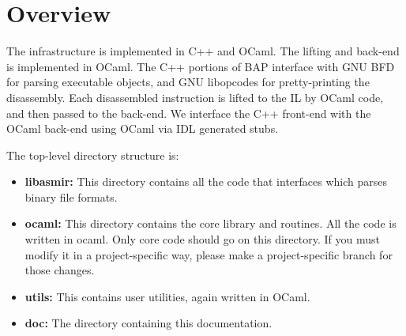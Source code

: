 \section{Overview}

The \bap infrastructure is implemented in C++ and OCaml.  The lifting
and back-end is implemented in OCaml. The C++ portions of BAP
interface with GNU BFD for parsing executable objects, and GNU
libopcodes for pretty-printing the disassembly. Each disassembled
instruction is lifted to the IL by OCaml code, and then passed to the
back-end.  We interface the C++ front-end with the OCaml back-end
using OCaml via IDL generated stubs.


The \bap top-level directory structure is:
\begin{itemize}\squish
\item {\bf libasmir:} This directory contains all the code that
  interfaces which parses binary file formats.

\item {\bf ocaml:} This directory contains the core \bap library and
  routines. All the code is written in ocaml. Only core \bap code
  should go on this directory. If you must modify it in a
  project-specific way, please make a project-specific branch for
  those changes.

\item {\bf utils:} This contains user utilities, again written in OCaml.

\item {\bf doc:} The directory containing this documentation.
\end{itemize}
